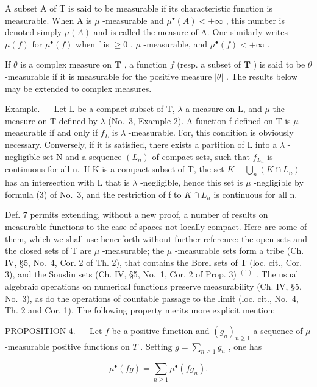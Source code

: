 A subset A of T is said to be measurable if its characteristic function is measurable. When A is \(\mu\) -measurable and \(\mu^{\bullet}(A) < +\infty\) , this number is denoted simply \(\mu(A)\) and is called the measure of A. One similarly writes \(\mu(f)\) for \(\mu^{\bullet}(f)\) when f is \(\geqslant 0\) , \(\mu\) -measurable, and \(\mu^{\bullet}(f) < +\infty\) .

If \(\theta\) is a complex measure on \(\mathbf{T}\) , a function \(f\) (resp. a subset of \(\mathbf{T}\) ) is said to be \(\theta\) -measurable if it is measurable for the positive measure \(|\theta|\) . The results below may be extended to complex measures.

Example. --- Let L be a compact subset of T, \(\lambda\) a measure on L, and \(\mu\) the measure on T defined by \(\lambda\) (No.~3, Example 2). A function f defined on T is \(\mu\) -measurable if and only if \(f_{L}\) is \(\lambda\) -measurable. For, this condition is obviously necessary. Conversely, if it is satisfied, there exists a partition of L into a \(\lambda\) -negligible set N and a sequence \((L_{n})\) of compact sets, such that \(f_{L_{n}}\) is continuous for all n.~If K is a compact subset of T, the set \(K - \bigcup_{n}(K \cap L_{n})\) has an
intersection with L that is \(\lambda\) -negligible, hence this set is \(\mu\) -negligible by formula (3) of No.~3, and the restriction of f to \(K \cap L_{n}\) is continuous for all n.

Def. 7 permits extending, without a new proof, a number of results on measurable functions to the case of spaces not locally compact. Here are some of them, which we shall use henceforth without further reference: the open sets and the closed sets of T are \(\mu\) -measurable; the \(\mu\) -measurable sets form a tribe (Ch. IV, §5, No.~4, Cor. 2 of Th. 2), that contains the Borel sets of T (loc. cit., Cor. 3), and the Souslin sets (Ch. IV, §5, No.~1, Cor. 2 of Prop. 3) \(^{(1)}\) . The usual algebraic operations on numerical functions preserve measurability (Ch. IV, §5, No.~3), as do the operations of countable passage to the limit (loc. cit., No.~4, Th. 2 and Cor. 1). The following property merits more explicit mention:

PROPOSITION 4. --- Let \(f\) be a positive function and \((g_n)_{n \geqslant 1}\) a sequence of \(\mu\) -measurable positive functions on \(T\) . Setting \(g = \sum_{n \geqslant 1} g_n\) , one has

\[
\mu^ {\bullet} (f g) = \sum_ {n \geqslant 1} \mu^ {\bullet} (f g _ {n}).\tag{4}
\]

